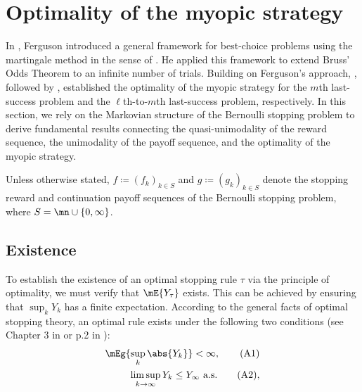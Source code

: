 \documentclass[11pt]{article}
\begin{document}
\section{Optimality of the myopic strategy}\label{sec4}
In \cite{FergusonOdds}, Ferguson introduced a general framework for best-choice problems using the  {martingale method} in the sense of \cite{Peskir}. He applied this framework to extend Bruss' Odds Theorem \cite{Odds} to an infinite number of trials. Building on Ferguson's  approach, \cite{TamakiOdds}, followed by  \cite{MatsuiAno}, established the optimality of the myopic strategy for the $m$th last-success problem and the $\ell$th-to-$m$th last-success problem, respectively. In this section, we rely on the Markovian structure of the Bernoulli stopping problem to derive fundamental results connecting  the quasi-unimodality of the reward sequence, the unimodality of the payoff sequence, and  the optimality of the myopic strategy. 

 Unless otherwise stated,   $f \coloneqq(f_k)_{ k \in S}$ and $g\coloneqq (g_k)_{ k \in S}$ denote the stopping reward and continuation payoff sequences of the Bernoulli stopping problem, where  $S = \mn \cup \{0, \infty\}$.
\subsection{Existence}

To establish the existence of an optimal stopping rule $\tau$ via the principle of optimality, we must verify that  $\mE{Y_{\tau}}$ exists. This  can be achieved by ensuring  that $\sup_k {Y_k}$ has a finite expectation. According to the general facts of optimal stopping theory, an optimal rule exists  under the following two conditions  (see Chapter 3 in \cite{FergusonBook} or p.2 in \cite{Peskir}): 
\begin{alignat}{2}
	\mEg { \sup_k \abs{Y_k}} < \infty, \tag{A1} \label{eqn.A1}\\ 
	\limsup_{k \to \infty} Y_k \le Y_\infty \text{ a.s.} \tag{A2}\label{eqn.A2},
\end{alignat}
\end{document}
